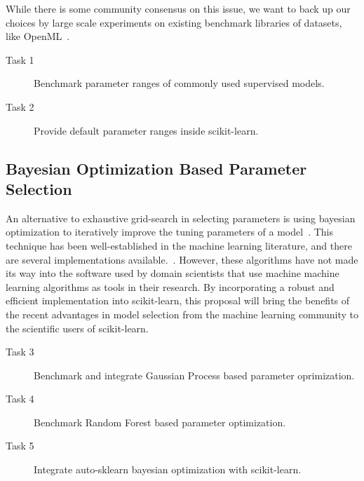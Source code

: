 While there is some community consensus on this issue, we want to back
up our choices by large scale experiments on existing benchmark libraries
of datasets, like OpenML~\cite{van2013openml}.
\begin{description}
    \item [Task 1] Benchmark parameter ranges of commonly used supervised models.
    \item [Task 2] Provide default parameter ranges inside scikit-learn.
\end{description}

\subsection{Bayesian Optimization Based Parameter Selection}
An alternative to exhaustive grid-search in selecting parameters is using
bayesian optimization to iteratively improve the tuning parameters of a model~\cite{NIPS2011_4443, shahriari2016taking, NIP2012_4522}.
This technique has been well-established in the machine learning literature,
and there are several implementations available.~\cite{bergstra2013hyperopt, feurer-nips2015, komer2014hyperopt, snoek2015scalable}.
However, these algorithms have not made its way into the software used by
domain scientists that use machine machine learning algorithms as tools in
their research.
By incorporating a robust and efficient implementation into scikit-learn,
this proposal will bring the benefits of the recent advantages in model selection
from the machine learning community to the scientific users of scikit-learn.
\begin{description}
    \item [Task 3] Benchmark and integrate Gaussian Process based parameter oprimization.
    \item [Task 4] Benchmark Random Forest based parameter optimization.
    \item [Task 5] Integrate auto-sklearn bayesian optimization with scikit-learn.
\end{description}

